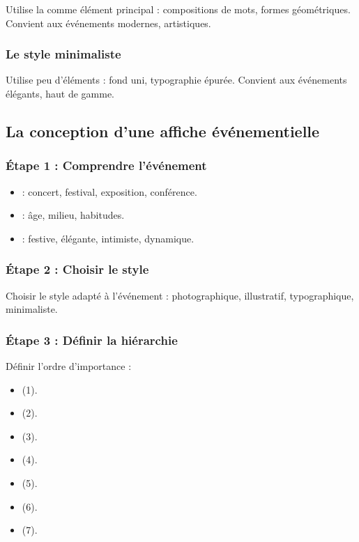 Utilise la  comme élément principal : compositions de mots, formes géométriques. Convient aux événements modernes, artistiques.

\subsubsection{Le style minimaliste}

Utilise peu d'éléments : fond uni, typographie épurée. Convient aux événements élégants, haut de gamme.

\subsection{La conception d'une affiche événementielle}

\subsubsection{Étape 1 : Comprendre l'événement}

\begin{itemize}
    \item {} : concert, festival, exposition, conférence.
    \item {} : âge, milieu, habitudes.
    \item {} : festive, élégante, intimiste, dynamique.
\end{itemize}

\subsubsection{Étape 2 : Choisir le style}

Choisir le style adapté à l'événement : photographique, illustratif, typographique, minimaliste.

\subsubsection{Étape 3 : Définir la hiérarchie}

Définir l'ordre d'importance :

\begin{itemize}
    \item {} (1).
    \item {} (2).
    \item {} (3).
    \item {} (4).
    \item {} (5).
    \item {} (6).
    \item {} (7).
\end{itemize}

